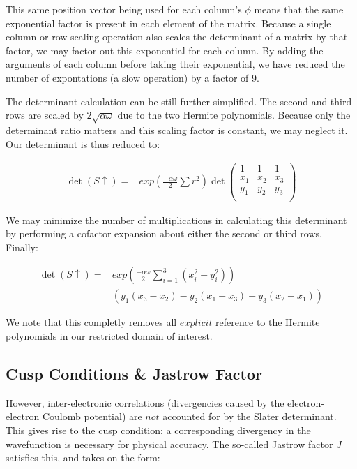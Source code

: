\documentclass[11pt, conference, compsocconf]{IEEEtran}
\begin{document}
This same position vector being used for each column's $\phi$ means that the same exponential factor is present in each element of the matrix. Because a single column or row scaling operation also scales the determinant of a matrix by that factor, we may factor out this exponential for each column. By adding the arguments of each column before taking their exponential, we have reduced the number of expontations (a slow operation) by a factor of 9. 

The determinant calculation can be still further simplified. The second and third rows are scaled by $2\sqrt{\alpha\omega}$ due to the two Hermite polynomials. Because only the determinant ratio matters and this scaling factor is constant, we may neglect it. Our determinant is thus reduced to:

\begin{align}\det\left(S\uparrow\right) =& exp\left(\frac{-\alpha\omega}{2}\sum r^2\right)\det\left(\begin{array}{ccc}
1 & 1 & 1\\
x_1 & x_2 & x_3 \\
y_1 & y_2 & y_3 \\
\end{array}\right)\end{align}

We may minimize the number of multiplications in calculating this determinant by performing a cofactor expansion about either the second or third rows. Finally:

\begin{align}\det\left(S\uparrow\right) =& exp\left(\frac{-\alpha\omega}{2}\sum\limits_{i=1}^{3} \left(x_i^2 + y_i^2\right)\right)\\
& \left(y_1(x_3-x_2) - y_2(x_1-x_3) - y_3(x_2-x_1)\right)\end{align}

We note that this completly removes all $explicit$ reference to the Hermite polynomials in our restricted domain of interest.

\subsection{Cusp Conditions \& Jastrow Factor}
However, inter-electronic correlations (divergencies caused by the electron-electron Coulomb potential) are $not$ accounted for by the Slater determinant. This gives rise to the cusp condition: a corresponding divergency in the wavefunction is necessary for physical accuracy. The so-called Jastrow factor $J$ satisfies this, and takes on the form:
\end{document}
